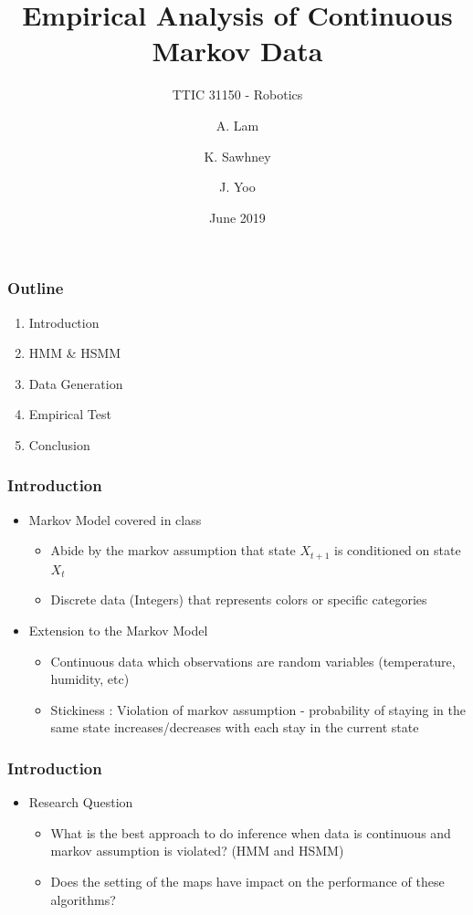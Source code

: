 \documentclass{beamer}
\title[]{Empirical Analysis of Continuous Markov Data}
\subtitle{TTIC 31150 - Robotics}
\author[Lam, Sawhney, Yoo]{A. Lam \and K. Sawhney \and J. Yoo}
\date[June 2019]{June 2019}
\begin{document}
\frame{\titlepage}

\begin{frame}
\frametitle{Outline}
    \begin{enumerate}[I]
        \item Introduction
        \item HMM \& HSMM
        \item Data Generation
        \item Empirical Test
        \item Conclusion
    \end{enumerate}
\end{frame}


\begin{frame}
\frametitle{Introduction}
    \begin{itemize}
        \item Markov Model covered in class
        \begin{itemize}
            \item Abide by the markov assumption that state $X_{t+1}$ is conditioned on state $X_t$
            \item Discrete data (Integers) that represents colors or specific categories
        \end{itemize}
        \item Extension to the Markov Model
        \begin{itemize}
            \item Continuous data which observations are random variables (temperature, humidity, etc)
            \item Stickiness : Violation of markov assumption - probability of staying in the same state increases/decreases with each stay in the current state
        \end{itemize}
    \end{itemize}
\end{frame}

\begin{frame}
    \frametitle{Introduction}
        \begin{itemize}
            \item Research Question
            \begin{itemize}
                \item What is the best approach to do inference when data is continuous and markov assumption is violated? (HMM and HSMM)
                \item Does the setting of the maps have impact on the performance of these algorithms?
            \end{itemize}
        \end{itemize}
    \end{frame}
\end{document}
